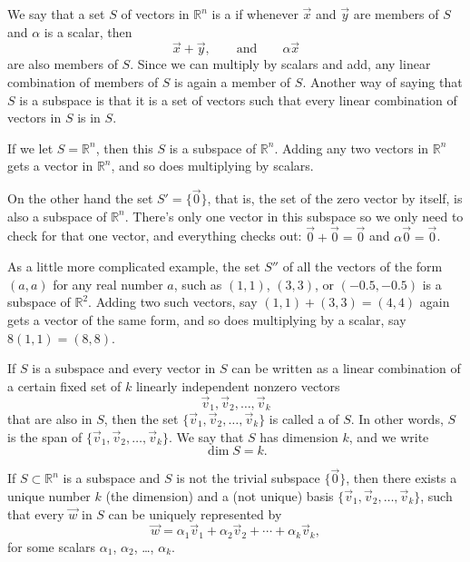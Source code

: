 We say that a set $S$ of vectors in ${\mathbb R}^n$ is a
\emph{} if
whenever $\vec{x}$ and $\vec{y}$ are members of $S$ and
$\alpha$ is a scalar, then
\begin{equation*}
\vec{x} + \vec{y}, \qquad \text{and} \qquad \alpha \vec{x}
\end{equation*}
are also members of $S$.  Since we can multiply by scalars and add,
any linear combination of members of $S$ is again a member of $S$.  Another
way of saying that $S$ is a subspace is that it is a set of vectors such
that every linear combination of vectors in $S$ is in $S$.

\begin{example} \label{example:simplesubspaces}
If we let $S = {\mathbb R}^n$, then this $S$ is a subspace of
${\mathbb R}^n$.  Adding any two vectors in ${\mathbb R}^n$ gets a vector in
${\mathbb R}^n$, and so does multiplying by scalars.

On the other hand the set $S' = \{ \vec{0} \}$, that is,
the set of the zero vector by itself, is 
also a subspace of ${\mathbb R}^n$.  There's only one vector in this
subspace so we only need to check for that one vector, and everything checks
out: $\vec{0}+\vec{0} = \vec{0}$ and $\alpha \vec{0} = \vec{0}$.

As a little more complicated example, the set $S''$ of all the vectors of the form
$(a,a)$ for any real number $a$, such as $(1,1)$, $(3,3)$, or $(-0.5,-0.5)$
is a subspace of ${\mathbb R}^2$.  Adding two such vectors, say
$(1,1)+(3,3) = (4,4)$ again gets a vector of the same form, and so does
multiplying by a scalar, say $8(1,1) = (8,8)$.
\end{example}

If $S$ is a subspace and every vector in $S$ can be written
as a linear combination of a certain fixed set of $k$ linearly independent
nonzero vectors
\begin{equation*}
\vec{v}_1, \vec{v}_2, \ldots, \vec{v}_k
\end{equation*}
that are also in $S$,
then the set 
$\{ \vec{v}_1, \vec{v}_2, \ldots, \vec{v}_k \}$ is called a
\emph{} of $S$.  In other words, $S$
is the span of 
$\{ \vec{v}_1, \vec{v}_2, \ldots, \vec{v}_k \}$.
We say that $S$ has dimension $k$,
and we write 
\begin{equation*}
\dim S = k .
\end{equation*}

\begin{theorem}
If $S \subset {\mathbb R}^n$ is a subspace and $S$ is not the trivial
subspace $\{ \vec{0} \}$, then there exists a
unique number $k$ (the dimension) and a (not unique)
basis
$\{ \vec{v}_1, \vec{v}_2, \ldots, \vec{v}_k \}$, such that every
$\vec{w}$ in $S$ can be uniquely represented by
\begin{equation*}
\vec{w} = 
\alpha_1 \vec{v}_1 + 
\alpha_2 \vec{v}_2 + 
\cdots
+
\alpha_k \vec{v}_k ,
\end{equation*}
for some scalars $\alpha_1$, $\alpha_2$, \ldots, $\alpha_k$.
\end{theorem}

